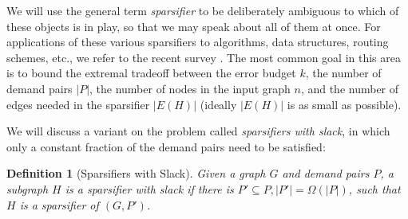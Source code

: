 \documentclass{article}
\newtheorem{definition}{Definition}
\begin{document}
We will use the general term \emph{sparsifier} to be deliberately ambiguous to which of these objects is in play, so that we may speak about all of them at once.
For applications of these various sparsifiers to algorithms, data structures, routing schemes, etc., we refer to the recent survey \cite{ABSHJKS19}.
The most common goal in this area is to bound the extremal tradeoff between the error budget $k$, the number of demand pairs $|P|$, the number of nodes in the input graph $n$, and the number of edges needed in the sparsifier $|E(H)|$ (ideally $|E(H)|$ is as small as possible).

We will discuss a variant on the problem called \emph{sparsifiers with slack}, in which only a constant fraction of the demand pairs need to be satisfied:
\begin{definition} [Sparsifiers with Slack]
Given a graph $G$ and demand pairs $P$, a subgraph $H$ is a \emph{sparsifier with slack} if there is $P' \subseteq P, |P'| = \Omega\left(|P|\right)$, such that $H$ is a sparsifier of $(G, P')$.
\end{definition}
\end{document}
